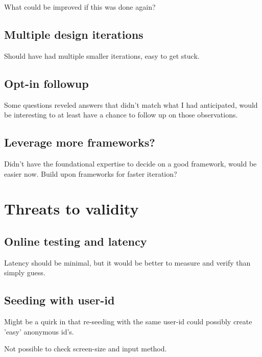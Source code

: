 \documentclass[nofilelist,dvipsnames]{cslthse-msc}
\begin{document}
{        What could be improved if this was done again?

        \subsection{Multiple design iterations}

          Should have had multiple smaller iterations, easy to get stuck.

        \subsection{Opt-in followup}

          Some questions reveled answers that didn't match what I had
          anticipated, would be interesting to at least have a chance to follow
          up on those observations.

        \subsection{Leverage more frameworks?}

          Didn't have the foundational expertise to decide on a good
          framework, would be easier now.
          Build upon frameworks for faster iteration?

			\section{Threats to validity}

        \subsection{Online testing and latency}

          Latency should be minimal, but it would be better to measure and
          verify than simply guess.

        \subsection{Seeding with user-id}

          Might be a quirk in that re-seeding with the same user-id could
          possibly create 'easy' anonymous id's.

        Not possible to check screen-size and input method.






}
\end{document}
